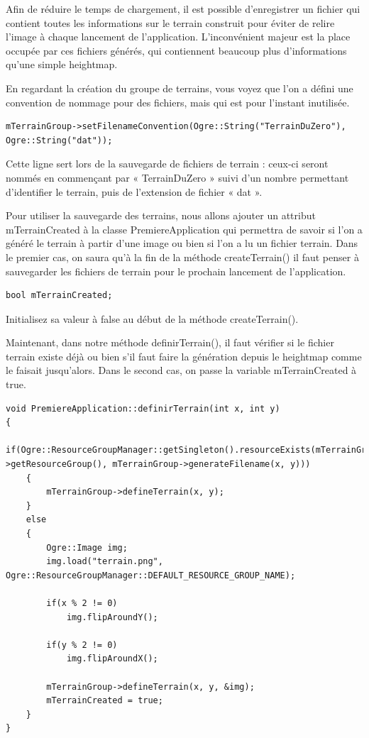 Afin de r\'eduire le temps de chargement, il est possible d'enregistrer un fichier qui contient toutes les informations sur le terrain construit pour \'eviter de relire l'image \`a chaque lancement de l'application. L'inconv\'enient majeur est la place occup\'ee par ces fichiers g\'en\'er\'es, qui contiennent beaucoup plus d'informations qu'une simple heightmap.

En regardant la cr\'eation du groupe de terrains, vous voyez que l'on a d\'efini une convention de nommage pour des fichiers, mais qui est pour l'instant inutilis\'ee.

\begin{lstlisting}[caption={}]
mTerrainGroup->setFilenameConvention(Ogre::String("TerrainDuZero"), Ogre::String("dat"));
\end{lstlisting}

Cette ligne sert lors de la sauvegarde de fichiers de terrain : ceux-ci seront nomm\'es en commençant par « TerrainDuZero » suivi d'un nombre permettant d'identifier le terrain, puis de l'extension de fichier « dat ».

Pour utiliser la sauvegarde des terrains, nous allons ajouter un attribut mTerrainCreated \`a la classe PremiereApplication qui permettra de savoir si l'on a g\'en\'er\'e le terrain \`a partir d'une image ou bien si l'on a lu un fichier terrain. Dans le premier cas, on saura qu'\`a la fin de la m\'ethode createTerrain() il faut penser \`a sauvegarder les fichiers de terrain pour le prochain lancement de l'application.

\begin{lstlisting}[caption={}]
bool mTerrainCreated;
\end{lstlisting}

Initialisez sa valeur \`a false au d\'ebut de la m\'ethode createTerrain().

Maintenant, dans notre m\'ethode definirTerrain(), il faut v\'erifier si le fichier terrain existe d\'ej\`a ou bien s'il faut faire la g\'en\'eration depuis le heightmap comme le faisait jusqu'alors. Dans le second cas, on passe la variable mTerrainCreated \`a true.

\begin{lstlisting}[caption={}]
void PremiereApplication::definirTerrain(int x, int y)
{
    if(Ogre::ResourceGroupManager::getSingleton().resourceExists(mTerrainGroup->getResourceGroup(), mTerrainGroup->generateFilename(x, y)))
    {
        mTerrainGroup->defineTerrain(x, y);
    }
    else
    {
        Ogre::Image img;
        img.load("terrain.png", Ogre::ResourceGroupManager::DEFAULT_RESOURCE_GROUP_NAME);

        if(x % 2 != 0)
            img.flipAroundY();

        if(y % 2 != 0)
            img.flipAroundX();

        mTerrainGroup->defineTerrain(x, y, &img);
        mTerrainCreated = true;
    }
}
\end{lstlisting}

